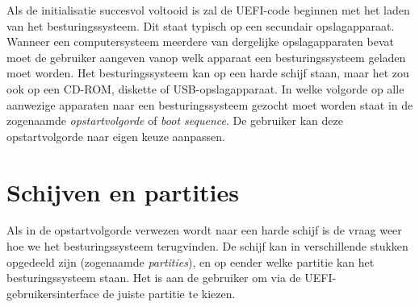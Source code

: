 Als de initialisatie succesvol voltooid is zal de UEFI-code beginnen met
het laden van het besturingssysteem. Dit staat typisch op een
secundair opslagapparaat. Wanneer een computersysteem meerdere van
dergelijke opslagapparaten bevat moet de gebruiker aangeven vanop
welk apparaat een besturingssysteem geladen moet worden. Het
besturingssysteem kan op een harde schijf staan, maar het zou ook op
een CD-ROM, diskette of USB-opslagapparaat. In welke volgorde op alle
aanwezige apparaten naar een besturingssysteem gezocht moet worden
staat in de zogenaamde \emph{opstartvolgorde} of
\emph{boot sequence}. De gebruiker kan deze opstartvolgorde naar eigen keuze aanpassen.



\section{Schijven en partities}





Als in de opstartvolgorde verwezen wordt naar een harde schijf
is de vraag weer hoe we het besturingssysteem terugvinden. De schijf kan in verschillende stukken
opgedeeld zijn (zogenaamde \emph{partities}), en op eender welke partitie kan het besturingssysteem staan.
Het is aan de gebruiker om via de UEFI-gebruikersinterface de juiste partitie te kiezen.

